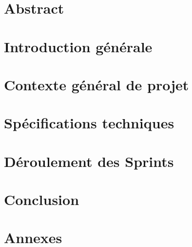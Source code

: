 \documentclass[12pt,twoside]{report}
\begin{document}
\chapter*{Abstract} %


\tableofcontents %
\listoffigures %
\listoftables %


\chapter{Introduction générale} %


\chapter{Contexte général  de projet} %


\chapter{Spécifications techniques}


\chapter{Déroulement des Sprints}


\chapter{Conclusion}



\appendix

\printbibliography
\chapter{Annexes} %

\end{document}
